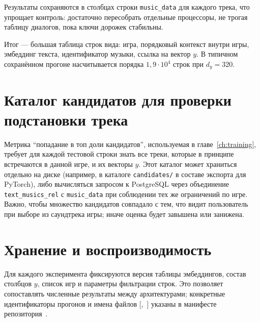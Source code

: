 Результаты сохраняются в столбцах строки \texttt{music\_data} для каждого трека, что упрощает контроль: достаточно пересобрать отдельные процессоры, не трогая таблицу диалогов, пока ключи дорожек стабильны.

Итог --- большая таблица строк вида: игра, порядковый контекст внутри игры, эмбеддинг текста, идентификатор музыки, ссылка на вектор $y$. В типичном сохранённом прогоне насчитывается порядка $1{,}9\cdot 10^4$ строк при $d_y = 320$.

\section{Каталог кандидатов для проверки подстановки трека}

Метрика ``попадание в топ доли кандидатов'', используемая в главе~\ref{ch:training}, требует для каждой тестовой строки знать все треки, которые в принципе встречаются в данной игре, и их векторы $y$. Этот каталог может храниться отдельно на диске (например, в каталоге \texttt{candidates/} в составе экспорта для PyTorch), либо вычисляться запросом к PostgreSQL через объединение \texttt{text\_musics\_rel} с \texttt{music\_data} при соблюдении тех же ограничений по игре. Важно, чтобы множество кандидатов совпадало с тем, что видит пользователь при выборе из саундтрека игры; иначе оценка будет завышена или занижена.

\section{Хранение и воспроизводимость}

\begin{sloppypar}
Для каждого эксперимента фиксируются версия таблицы эмбеддингов, состав столбцов $y$, список игр и параметры фильтрации строк. Это позволяет сопоставлять численные результаты между архитектурами; конкретные идентификаторы прогонов и имена файлов [,~] указаны в манифесте ~ репозитория~.
\end{sloppypar}
